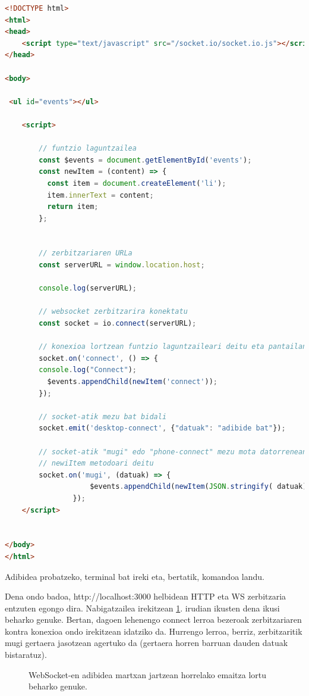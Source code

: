 \begin{lstlisting}[language=HTML,numbers=none]
<!DOCTYPE html>
<html>
<head>
	<script type="text/javascript" src="/socket.io/socket.io.js"></script>
</head>

<body>

 <ul id="events"></ul>

	<script>
	
		// funtzio laguntzailea
		const $events = document.getElementById('events');
		const newItem = (content) => {
		  const item = document.createElement('li');
		  item.innerText = content;
		  return item;
		};


		// zerbitzariaren URLa
		const serverURL = window.location.host;
	
		console.log(serverURL);

		// websocket zerbitzarira konektatu
		const socket = io.connect(serverURL);

		// konexioa lortzean funtzio laguntzaileari deitu eta pantailan idatzi
		socket.on('connect', () => {
		console.log("Connect");
		  $events.appendChild(newItem('connect'));
		});

		// socket-atik mezu bat bidali
		socket.emit('desktop-connect', {"datuak": "adibide bat"});

		// socket-atik "mugi" edo "phone-connect" mezu mota datorrenean
		// newiItem metodoari deitu
		socket.on('mugi', (datuak) => {
					$events.appendChild(newItem(JSON.stringify( datuak)));
				});
	</script>


</body>
</html>
\end{lstlisting}

Adibidea probatzeko, terminal bat ireki eta, bertatik,  komandoa landu.

Dena ondo badoa, http://localhost:3000 helbidean HTTP eta WS zerbitzaria entzuten egongo dira. Nabigatzailea irekitzean \ref{fig:websocketadibidea}. irudian ikusten dena ikusi beharko genuke. Bertan, dagoen lehenengo \textquotesingle{}connect\textquotesingle{} lerroa bezeroak zerbitzariaren kontra konexioa ondo irekitzean idatziko da. Hurrengo lerroa, berriz, zerbitzaritik \textquotesingle{}mugi\textquotesingle{} gertaera jasotzean agertuko da (gertaera horren barruan dauden datuak bistaratuz).

\begin{figure}[ht]
	\centering
{}
\caption{WebSocket-en adibidea martxan jartzean horrelako emaitza lortu beharko genuke.}
\label{fig:websocketadibidea}
\end{figure}

